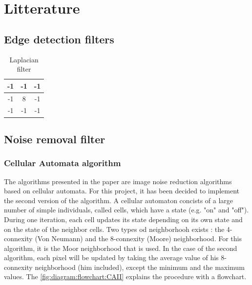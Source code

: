 \chapter{Litterature}



\section{Edge detection filters}


\begin{table}[h]
	\centering
	\caption{Laplacian filter}
	\label{tab:filter:laplacian}
	\begin{tabular}{|c|c|c|}
\hline
-1 & -1 & -1 \\ \hline
-1 & 8  & -1 \\ \hline
-1 & -1 & -1 \\ \hline
	\end{tabular}
\end{table}




\section{Noise removal filter}




\subsection{Cellular Automata algorithm}

The algorithms presented in the paper \cite{bib:filter:CA} are image noise reduction algorithms based on cellular automata. For this project, it has been decided to implement the second version of the algorithm. A cellular automaton concists of a large number of simple individuals, called cells, which have a state (e.g. "on" and "off"). During one iteration, each cell updates its state depending on its own state and on the state of the neighbor cells. Two types od neighborhooh exists : the 4-connexity (Von Neumann) and the 8-connexity (Moore) neighborhood. For this algorithm, it is the Moor neighborhood that is used. In the case of the second algorithm, each pixel will be updated by taking the average value of his 8-connexity neighborhood (him included), except the minimum and the maximum values. The \vref{fig:diagram:flowchart:CAII} explains the procedure with a flowchart.



